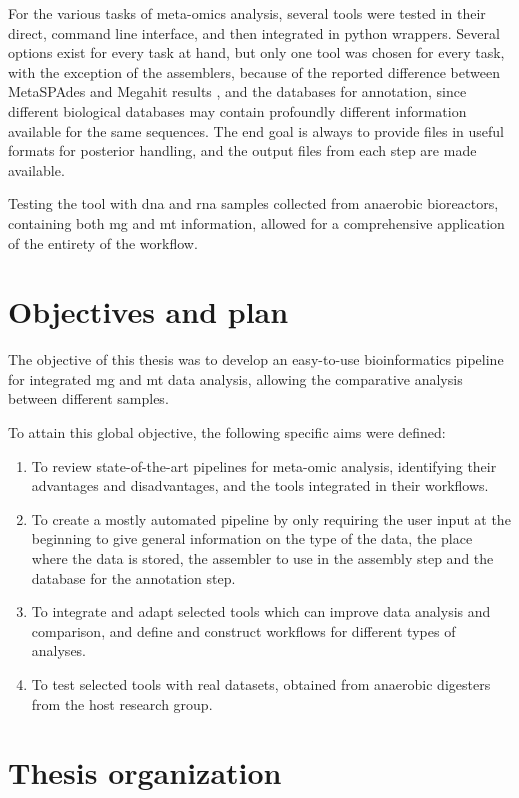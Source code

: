 \documentclass[
  oneside,
  11pt, a4paper,
  footinclude=true,
  headinclude=true,
  cleardoublepage=empty
]{scrbook}
\begin{document}
    For the various tasks of meta-omics analysis, several tools were tested in their direct, command line interface, and then integrated in python wrappers. Several options exist for every task at hand, but only one tool was chosen for every task, with the exception of the assemblers, because of the reported difference between MetaSPAdes and Megahit results \citep{Vollmers2017}, and the databases for annotation, since different biological databases may contain profoundly different information available for the same sequences. The end goal is always to provide files in useful formats for posterior handling, and the output files from each step are made available.
    
    Testing the tool with \gls{dna} and \gls{rna} samples collected from anaerobic bioreactors, containing both \gls{mg} and \gls{mt} information, allowed for a comprehensive application of the entirety of the workflow.

    \section{Objectives and plan}

    The objective of this thesis was to develop an easy-to-use bioinformatics pipeline for integrated \gls{mg} and \gls{mt} data analysis, allowing the comparative analysis between different samples.
    
    To attain this global objective, the following specific aims were defined:
    \begin{enumerate}
        \item To review state-of-the-art pipelines for meta-omic analysis, identifying their advantages and disadvantages, and the tools integrated in their workflows.
        \item To create a mostly automated pipeline by only requiring the user input at the beginning to give general information on the type of the data, the place where the data is stored, the assembler to use in the assembly step and the database for the annotation step.
        \item To integrate and adapt selected tools which can improve data analysis and comparison, and define and construct workflows for different types of analyses.
        \item To test selected tools with real datasets, obtained from anaerobic digesters from the host research group.
    \end{enumerate}
    
    \section{Thesis organization}
    
\end{document}
